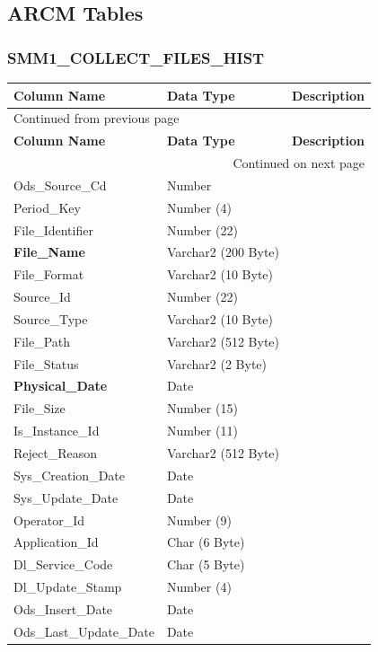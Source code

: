 \documentclass[12pt,twoside]{article}
\begin{document}
\subsection{ARCM Tables}
\label{sec:orgheadline129}
\subsubsection{SMM1\_COLLECT\_FILES\_HIST}
\label{sec:orgheadline126}
\footnotesize

\begin{longtable}{l|l|l}
\hline
\textbf{Column Name} & \textbf{Data Type} & \textbf{Description}\\
\hline
\endfirsthead
\multicolumn{3}{l}{Continued from previous page} \\
\hline

\textbf{Column Name} & \textbf{Data Type} & \textbf{Description} \\

\hline
\endhead
\hline\multicolumn{3}{r}{Continued on next page} \\
\endfoot
\endlastfoot
\hline
Ods\_Source\_Cd & Number & \\
Period\_Key & Number (4) & \\
File\_Identifier & Number (22) & \\
\textbf{File\_Name} & Varchar2 (200 Byte) & \\
File\_Format & Varchar2 (10 Byte) & \\
Source\_Id & Number (22) & \\
Source\_Type & Varchar2 (10 Byte) & \\
File\_Path & Varchar2 (512 Byte) & \\
File\_Status & Varchar2 (2 Byte) & \\
\textbf{Physical\_Date} & Date & \\
File\_Size & Number (15) & \\
Is\_Instance\_Id & Number (11) & \\
Reject\_Reason & Varchar2 (512 Byte) & \\
Sys\_Creation\_Date & Date & \\
Sys\_Update\_Date & Date & \\
Operator\_Id & Number (9) & \\
Application\_Id & Char (6 Byte) & \\
Dl\_Service\_Code & Char (5 Byte) & \\
Dl\_Update\_Stamp & Number (4) & \\
Ods\_Insert\_Date & Date & \\
Ods\_Last\_Update\_Date & Date & \\
\hline
\end{longtable}
\end{document}
